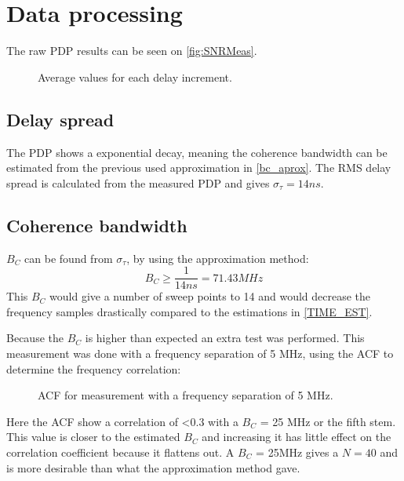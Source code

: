 \section{Data processing}
The raw PDP results can be seen on \autoref{fig:SNRMeas}.

\begin{figure}[H]
\centering

\caption{Average values for each delay increment.}
\label{fig:SNRMeas}
\end{figure}

\subsection{Delay spread}
The PDP shows a exponential decay, meaning the coherence bandwidth can be estimated from the previous used approximation in \autoref{bc_aprox}. The RMS delay spread is calculated from the measured PDP and gives $\sigma_{\tau} = 14ns$.

\subsection{Coherence bandwidth}\label{sec:coherence_bandwidth}

$B_C$ can be found from $\sigma_{\tau}$, by using the approximation method:
\begin{equation}
B_C \geq \frac{1}{14ns} = 71.43 MHz 
\end{equation}
This $B_C$ would give a number of sweep points to 14 and would decrease the frequency samples drastically compared to the estimations in \autoref{TIME_EST}.

Because the $B_C$ is higher than expected an extra test was performed. This measurement was done with a frequency separation of 5 MHz, using the \gls{ACF} to determine the frequency correlation:

\begin{figure}[H]
\centering

\caption{\Gls{ACF} for measurement with a frequency separation of 5 MHz.} 
\label{fig:coh_test}
\end{figure}

Here the \gls{ACF} show a correlation of <0.3 with a $B_C$ = 25 MHz or the fifth stem. This value is closer to the estimated $B_C$ and increasing it has little effect on the correlation coefficient because it flattens out. A $B_C$ = 25MHz gives a $N = 40$ and is more desirable than what the approximation method gave.

